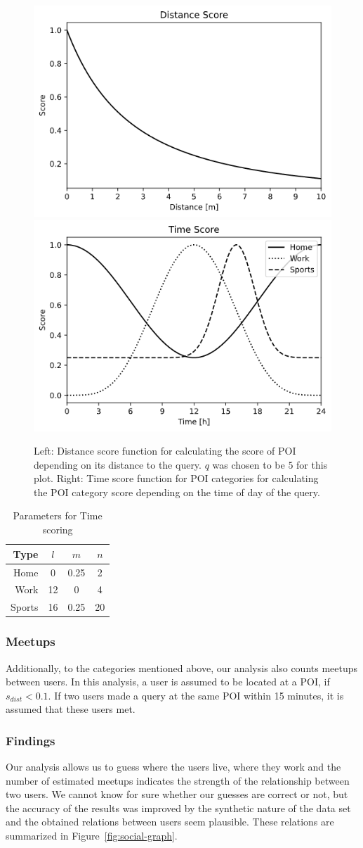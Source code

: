 \documentclass[9pt,conference]{IEEEtran}
\begin{document}
\begin{figure}
    \centering
    \includegraphics[width=0.45\linewidth]{images/distance-score.png}
    \includegraphics[width=0.45\linewidth]{images/time-scores.png}
    \caption{Left: Distance score function for calculating the score of POI depending on its distance to the query. $q$ was chosen to be $5$ for this plot. Right: Time score function for POI categories for calculating the POI category score depending on the time of day of the query.}
    \label{fig:distance-score}
\end{figure}

\begin{table}
\caption{Parameters for Time scoring}
\centering
\label{tbl:time-score-params}
\begin{tabular}{rccc}
\textbf{Type} & $l$ & $m$ & $n$ \\
\hline
Home & 0 & 0.25 & 2 \\
Work & 12 & 0 & 4 \\   
Sports & 16 & 0.25 & 20    
\end{tabular}
\end{table}

\subsubsection{Meetups}
Additionally, to the categories mentioned above, our analysis also counts meetups between users. In this analysis, a user is assumed to be located at a POI, if $s_{dist} < 0.1$. If two users made a query at the same POI within 15 minutes, it is assumed that these users met.

\subsubsection{Findings}
Our analysis allows us to guess where the users live, where they work and the number of estimated meetups indicates the strength of the relationship between two users. We cannot know for sure whether our guesses are correct or not, but the accuracy of the results was improved by the synthetic nature of the data set and the obtained relations between users seem plausible. These relations are summarized in Figure~\ref{fig:social-graph}.
\end{document}
